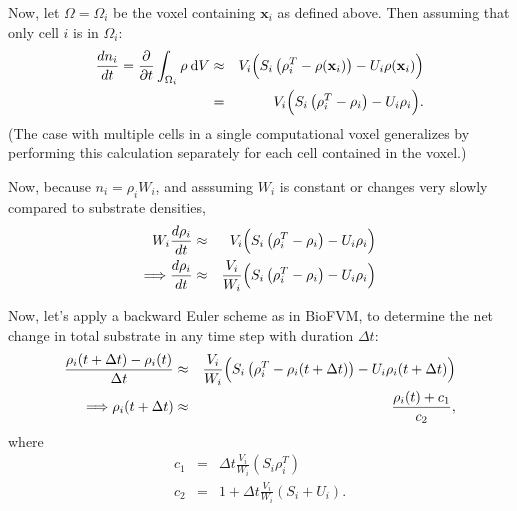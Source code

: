 \documentclass[11point]{article}
\newcommand{\beq}{\begin{eqnarray}}
\newcommand{\eeq}{\end{eqnarray}}
\renewcommand{\d}[1]{\:\mathrm{d}#1}
\renewcommand{\vec}[1]{\mathbf{#1}}
\begin{document}
Now, let $\Omega = \Omega_i$ be the voxel containing $\vec{x}_i$ as 
defined above. Then assuming that only cell $i$ is in $\Omega_i$:  \beq
\frac{ d{n_i} }{ d{t} }  
= 
\frac{ \partial }{ \partial t} 
\int_{\Omega_i} \rho \d{V}
 & \approx &  
V_i 
\Bigl(  S_i \left( \rho^T_i - \rho(\vec{x}_i) \right)  - U_i \rho(\vec{x}_i)   \Bigr)  \\
& = & 
V_i 
\Bigl(  S_i \left( \rho^T_i - \rho_i \right)  - U_i \rho_i   \Bigr) .
\eeq 
(The case with multiple cells in a single computational voxel generalizes by performing this calculation separately for each cell contained in the voxel.)

Now, because $n_i = \rho_i W_i $, and asssuming $W_i$ is constant or changes very slowly compared to substrate densities, 
\beq
W_i \frac{ d{\rho_i} }{ d{t} }  & \approx &  
V_i 
\Bigl(  S_i \left( \rho^T_i - \rho_i \right)  - U_i \rho_i   \Bigr)   \\
\Longrightarrow 
\frac{d\rho_i }{dt} & \approx & 
\frac{ V_i }{W_i }
\Bigl( S_i \left( \rho_i^T - \rho_i \right) - U_i \rho_i \Bigr) 
\eeq 

Now, let's apply a backward Euler scheme as in BioFVM, to determine the net change in total substrate in any time step with duration $\Delta t$: 
\beq
\frac{ \rho_i(t+\Delta t) - \rho_i(t)}{\Delta t} 
& \approx & 
\frac{ V_i }{W_i } 
\Bigl( S_i \left( \rho_i^T - \rho_i(t+\Delta t) \right) 
- U_i \rho_i( t + \Delta t ) \Bigr)\\
\Longrightarrow 
\rho_i( t+\Delta t) 
& \approx & 
\frac{\rho_i(t)  + c_1 }{c_2},
\eeq
where 
\beq
c_1 & = & \Delta t \frac{ V_i }{W_i } 
\left( S_i \rho_i^T \right) \\ 
c_2 & = & 1 + \Delta t \frac{ V_i }{W_i } 
\left( S_i + U_i \right) .
\eeq
\end{document}
